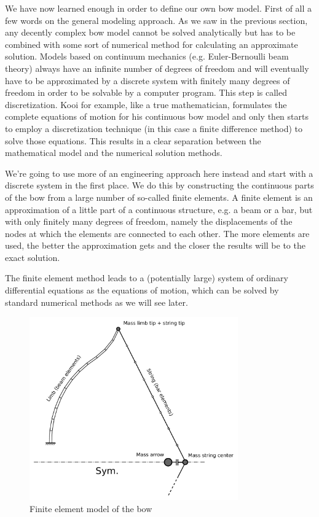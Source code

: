 We have now learned enough in order to define our own bow model. First of all a few words on the general modeling approach. As we saw in the previous section, any decently complex bow model cannot be solved analytically but has to be combined with some sort of numerical method for calculating an approximate solution. Models based on continuum mechanics (e.g. Euler-Bernoulli beam theory) always have an infinite number of degrees of freedom and will eventually have to be approximated by a discrete system with finitely many degrees of freedom in order to be solvable by a computer program. This step is called discretization. Kooi for example, like a true mathematician, formulates the complete equations of motion for his continuous bow model and only then starts to employ a discretization technique (in this case a finite difference method) to solve those equations. This results in a clear separation between the mathematical model and the numerical solution methods.

We're going to use more of an engineering approach here instead and start with a discrete system in the first place. We do this by constructing the continuous parts of the bow from a large number of so-called finite elements. A finite element is an approximation of a little part of a continuous structure, e.g. a beam or a bar, but with only finitely many degrees of freedom, namely the displacements of the nodes at which the elements are connected to each other. The more elements are used, the better the approximation gets and the closer the results will be to the exact solution.

The finite element method leads to a (potentially large) system of ordinary differential equations as the equations of motion, which can be solved by standard numerical methods as we will see later.

\begin{figure}[h]
\centering
\includegraphics[width=0.8\textwidth]{figures/model/bow-simulator}
\caption{Finite element model of the bow}
\label{fig:model:bow-simulator}
\end{figure}


